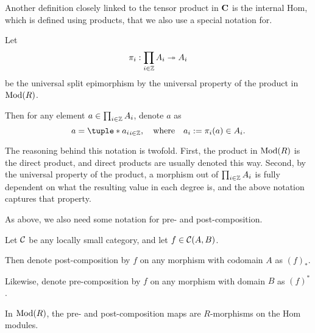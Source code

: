 Another definition closely linked to the tensor product in \( \operatorname{\mathbf{C}} \) is the internal Hom, which is defined using products, that we also use a special notation for.
\begin{notation}
    \label{not:prod}
    Let 
    \[
        \pi_i: \prod_{i \in {\mathbb{Z}}} A_i \twoheadrightarrow A_i
    \]
    be the universal split epimorphism by the universal property of the product in \( \operatorname{Mod}(R) \).
    
    Then for any element \( a \in \prod_{i \in {\mathbb{Z}}} A_i \), denote \( a \) as
    \[
        a = \tuple*{a_i}_{i \in \Zb}, \quad \text{where} \quad a_i := \pi_i(a) \in A_i.
    \]
\end{notation}

The reasoning behind this notation is twofold. First, the product in \( \operatorname{Mod}(R) \) is the direct product, and direct products are usually denoted this way. Second, by the universal property of the product, a morphism out of \( \prod_{i \in {\mathbb{Z}}} A_i \) is fully dependent on what the resulting value in each degree is, and the above notation captures that property.

As above, we also need some notation for pre- and post-composition.
\begin{notation}
    Let \( {\mathcal{C}} \) be any locally small category, and let \( f \in {\mathcal{C}}(A, B) \).

    Then denote post-composition by \( f \) on any morphism with codomain \( A \) as \( (f)_* \).

    Likewise, denote pre-composition by \( f \) on any morphism with domain \( B \) as \( (f)^* \).
\end{notation}
In \( \operatorname{Mod}(R) \), the pre- and post-composition maps are \( R \)-morphisms on the Hom modules.


